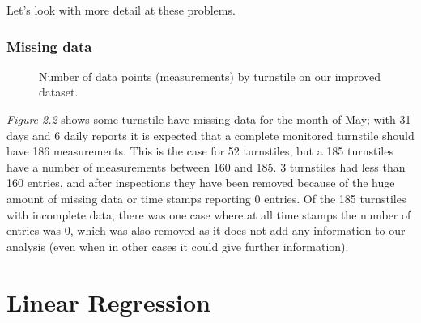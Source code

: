 \documentclass[letterpaper,10pt,english]{sphinxmanual}
\begin{document}
Let's look with more detail at these problems.


\subsection{Missing data}
\label{section1:missing-data}\begin{figure}[htbp]
\centering
\capstart

\caption{Number of data points (measurements) by turnstile on our improved dataset.}\label{section1:figure22}\end{figure}

\emph{Figure 2.2} shows some turnstile have missing data for the
month of May; with 31 days and 6 daily reports it is expected that a complete
monitored turnstile should have 186 measurements. This is the case for 52 turnstiles,
but a 185 turnstiles have a number of measurements between 160 and 185. 3 turnstiles
had less than 160 entries, and after inspections they have been removed because
of the huge amount of missing data or time stamps reporting 0 entries. Of the 185
turnstiles with incomplete data, there was one case where at all time stamps the
number of entries was 0, which was also removed as it does not add any information
to our analysis (even when in other cases it could give further information).


\chapter{Linear Regression}
\label{section2:linear-regression}\label{section2::doc}
\end{document}

